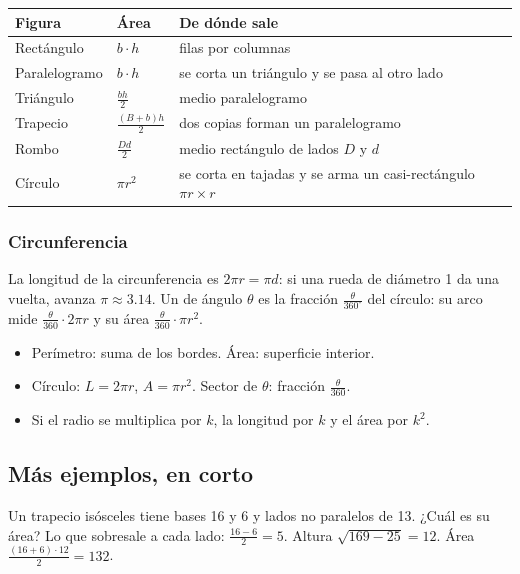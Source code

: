 \begin{center}\small
\begin{tabular}{@{}lll@{}}
\toprule
\textbf{Figura} & \textbf{Área} & \textbf{De dónde sale}\\\midrule
Rectángulo & $b \cdot h$ & filas por columnas\\
Paralelogramo & $b \cdot h$ & se corta un triángulo y se pasa al otro lado\\
Triángulo & $\tfrac{b h}{2}$ & medio paralelogramo\\
Trapecio & $\tfrac{(B + b) h}{2}$ & dos copias forman un paralelogramo\\
Rombo & $\tfrac{D d}{2}$ & medio rectángulo de lados $D$ y $d$\\
Círculo & $\pi r^2$ & se corta en tajadas y se arma un casi-rectángulo $\pi r \times r$\\
\bottomrule
\end{tabular}
\end{center}

\subsubsection{Circunferencia}
La longitud de la circunferencia es $2\pi r = \pi d$: si una rueda de diámetro 1 da una vuelta, avanza $\pi \approx
3.14$. Un  de ángulo $\theta$ es la fracción $\tfrac{\theta}{360^\circ}$ del círculo: su arco mide
$\tfrac{\theta}{360}\cdot 2\pi r$ y su área $\tfrac{\theta}{360}\cdot\pi r^2$.

\begin{regla}
\begin{itemize}
  \item Perímetro: suma de los bordes. Área: superficie interior.
  \item Círculo: $L = 2\pi r$, $A = \pi r^2$. Sector de $\theta$: fracción $\tfrac{\theta}{360}$.
  \item Si el radio se multiplica por $k$, la longitud por $k$ y el área por $k^2$.
\end{itemize}
\end{regla}

\subsection{Más ejemplos, en corto}
\begin{ejemplo}[Trapecio]
Un trapecio isósceles tiene bases 16 y 6 y lados no paralelos de 13. ¿Cuál es su área?
\solucion Lo que sobresale a cada lado: $\tfrac{16 - 6}{2} = 5$. Altura $\sqrt{169 - 25} = 12$. Área
$\tfrac{(16 + 6)\cdot 12}{2} = 132$.
\end{ejemplo}

